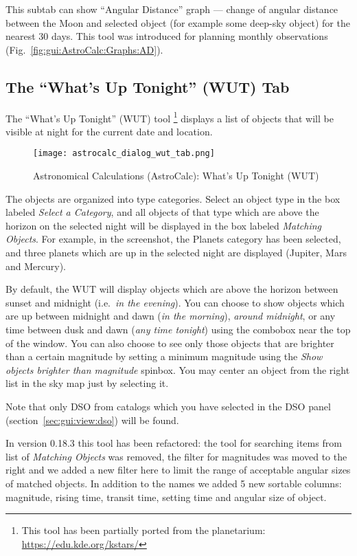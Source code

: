 This subtab  can show ``Angular Distance'' graph --- change of angular distance between the Moon and selected object (for example some deep-sky object) for the nearest 30 days. This tool was introduced for planning monthly observations (Fig.~\ref{fig:gui:AstroCalc:Graphs:AD}).

\subsection{The ``What's Up Tonight'' (WUT) Tab}
\label{sec:gui:AstroCalc:WUT}

The ``What's Up Tonight'' (WUT) tool%
	\footnote{This tool has been partially ported from the  planetarium: \url{https://edu.kde.org/kstars/}}
 displays a list of objects that will be visible at night for the current date and location.

\begin{figure}[htbp]
\centering\texttt{[image: astrocalc\_dialog\_wut\_tab.png]}
\caption{Astronomical Calculations (AstroCalc): What's Up Tonight (WUT)}
\label{fig:gui:AstroCalc:WUT}
\end{figure}

The objects are organized into type categories. Select an object type in the box labeled 
\emph{Select a Category}, and all objects of that type which are above the horizon on the selected night 
will be displayed in the box labeled \emph{Matching Objects}. For example, in the screenshot, 
the Planets category has been selected, and three planets which are up in the selected night are displayed (Jupiter, Mars and Mercury). 

By default, the WUT will display objects which are above the horizon between sunset and midnight (i.e.\ \emph{in the evening}). 
You can choose to show objects which are up between midnight and dawn (\emph{in the morning}), 
\emph{around midnight}, 
or any time between dusk and dawn (\emph{any time tonight}) using the combobox near the top of the window. 
You can also choose to see only those objects that are brighter than a certain magnitude by 
setting a minimum magnitude using the \emph{Show objects brighter than magnitude} spinbox. 
You may center an object from the right list in the sky map just by selecting it.

Note that only DSO from catalogs which you have selected in the DSO panel (section~\ref{sec:gui:view:dso}) will be found.

In version 0.18.3  this tool has been refactored: the tool for searching items from list of \emph{Matching Objects} was removed,
the filter for magnitudes was moved to the right and we added a new filter here to limit the range of acceptable angular sizes of matched objects.
In addition to the names we added 5 new sortable columns: magnitude, rising time, transit time, setting time and angular size of object.


